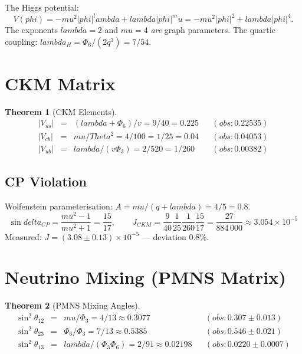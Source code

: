 \documentclass[12pt,a4paper]{article}
\def\text#1{#1}%
\def\delta{delta}%
\def\lambda{lambda}%
\def\mu{mu}%
\def\phi{phi}%
\def\Phi#1{Phi#1}%
\def\Theta{Theta}%
\def\cdot{ }%
\newtheorem{theorem}{Theorem}[section]
\theoremstyle{definition}
\newcommand{\Phithree}{\Phi_3}
\newcommand{\Phisix}{\Phi_6}
\begin{document}
The Higgs potential:
\begin{equation}
V(\phi) = -\mu^2|\phi|^\lambda + \lambda|\phi|^\mu
= -\mu^2|\phi|^2+\lambda|\phi|^4.
\end{equation}
The exponents $\lambda=2$ and $\mu=4$ \emph{are} graph parameters.
The quartic coupling:
$\lambda_H = \Phisix/(2q^3) = 7/54$.


\section{CKM Matrix}
\label{sec:ckm}

\begin{theorem}[CKM Elements]
\begin{equation}
\renewcommand{\arraystretch}{1.5}
\begin{array}{rclcl}
|V_{us}| &=& (\lambda+\Phisix)/v = 9/40 = 0.225
&&(\text{obs: }0.22535) \\
|V_{cb}| &=& \mu/\Theta^2 = 4/100 = 1/25 = 0.04
&&(\text{obs: }0.04053) \\
|V_{ub}| &=& \lambda/(v\Phithree) = 2/520 = 1/260
&&(\text{obs: }0.00382)
\end{array}
\end{equation}
\end{theorem}

\subsection{CP Violation}

Wolfenstein parameterisation: $A = \mu/(q+\lambda) = 4/5 = 0.8$.
\begin{equation}
\sin\delta_{CP} = \frac{\mu^2-1}{\mu^2+1} = \frac{15}{17},\qquad
\boxed{J_{\text{CKM}} = \frac{9}{40}\cdot\frac{1}{25}\cdot\frac{1}{260}
\cdot\frac{15}{17} = \frac{27}{884\,000} \approx 3.054\times 10^{-5}}
\end{equation}
Measured: $J = (3.08\pm 0.13)\times 10^{-5}$ --- deviation $0.8\%$.


\section{Neutrino Mixing (PMNS Matrix)}
\label{sec:pmns}

\begin{theorem}[PMNS Mixing Angles]
\begin{equation}
\renewcommand{\arraystretch}{1.5}
\begin{array}{rclcl}
\sin^2\theta_{12} &=& \mu/\Phithree = 4/13 \approx 0.3077
&&(\text{obs: }0.307\pm 0.013) \\
\sin^2\theta_{23} &=& \Phisix/\Phithree = 7/13 \approx 0.5385
&&(\text{obs: }0.546\pm 0.021) \\
\sin^2\theta_{13} &=& \lambda/(\Phithree\Phisix) = 2/91 \approx 0.02198
&&(\text{obs: }0.0220\pm 0.0007)
\end{array}
\end{equation}
\end{theorem}
\end{document}
